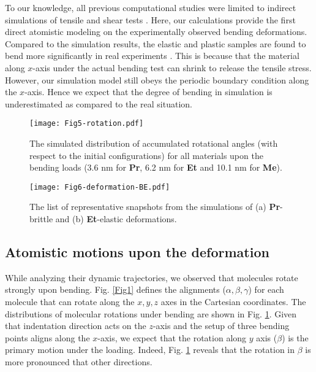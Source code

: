 \documentclass[prb,superscriptaddress,longbibliography, twocolumn]{revtex4-1}
\begin{document}
To our knowledge, all previous computational studies were limited to indirect simulations of tensile and shear tests \cite{devarapalli2019remarkably, wang2019computational, ootani2022density,  matveychuk2022quantitative}. Here, our calculations provide the first direct atomistic modeling on the experimentally observed bending deformations. Compared to the simulation results, the elastic and plastic samples are found to bend more significantly in real experiments \cite{devarapalli2019remarkably}. This is because that the material along $x$-axis under the actual bending test can shrink to release the tensile stress. However, our simulation model still obeys the periodic boundary condition along the $x$-axis. Hence we expect that the degree of bending in simulation is underestimated as compared to the real situation. %

\begin{figure}[ht]
\centering
\label{Fig5}
\texttt{[image: Fig5-rotation.pdf]}
\caption{\label{Fig5} The simulated distribution of accumulated rotational angles (with respect to the initial configurations) for all materials upon the bending loads (3.6 nm for \textbf{Pr}, 6.2 nm for \textbf{Et} and 10.1 nm for \textbf{Me}).}
\end{figure}

\begin{figure*}[htbp]
\centering
\texttt{[image: Fig6-deformation-BE.pdf]}
\caption{\label{Fig6} The list of representative snapshots from the simulations of (a) \textbf{Pr}-brittle and (b) \textbf{Et}-elastic deformations.}
\end{figure*}


\subsection{Atomistic motions upon the deformation}
While analyzing their dynamic trajectories, we observed that molecules rotate strongly upon bending. Fig. \ref{Fig1} defines the alignments ($\alpha, \beta, \gamma$) for each molecule that can rotate along the $x, y, z$ axes in the Cartesian coordinates. The distributions of molecular rotations under bending are shown in Fig. \ref{Fig5}. Given that indentation direction acts on the $z$-axis and the setup of three bending points aligns along the $x$-axis, we expect that the rotation along $y$ axis ($\beta$) is the primary motion under the loading. Indeed, Fig. \ref{Fig5} reveals that the rotation in $\beta$ is more pronounced that other directions. %
\end{document}
